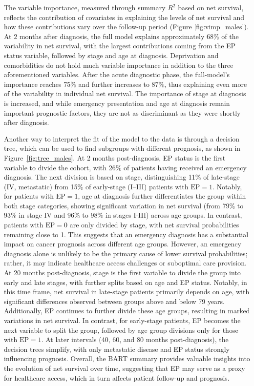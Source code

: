 \documentclass[12pt]{article}
\begin{document}
The variable importance, measured through summary $R^2$ based on net survival, reflects the contribution of covariates in explaining the levels of net survival and how these contributions vary over the follow-up period (Figure \ref{fig:vimp_males}). At 2 months after diagnosis, the full model explains approximately $68\%$ of the variability in net survival, with the largest contributions coming from the EP status variable, followed by stage and age at diagnosis. Deprivation and comorbidities do not hold much variable importance in addition to the three aforementioned variables. After the acute diagnostic phase, the full-model's importance reaches 75\% and further increases to 87\%, thus explaining even more of the variability in individual net survival. The importance of stage at diagnosis is increased, and while emergency presentation and age at diagnosis remain important prognostic factors, they are not as discriminant as they were shortly after diagnosis. 

Another way to interpret the fit of the model to the data is through a decision tree, which can be used to find subgroups with different prognosis, as shown in Figure~\ref{fig:tree_males}. At 2 months post-diagnosis, EP status is the first variable to divide the cohort, with 26\% of patients having received an emergency diagnosis. The next division is based on stage, distinguishing 11\% of late-stage (IV, metastatic) from 15\% of early-stage (I–III) patients with $\text{EP} = 1$. Notably, for patients with $\text{EP} = 1$, age at diagnosis further differentiates the group within both stage categories, showing significant variation in net survival (from 79\% to 93\% in stage IV and 96\% to 98\% in stages I-III) across age groups. In contrast, patients with $\text{EP} = 0$ are only divided by stage, with net survival probabilities remaining close to 1. This suggests that an emergency diagnosis has a substantial impact on cancer prognosis across different age groups. However, an emergency diagnosis alone is unlikely to be the primary cause of lower survival probabilities; rather, it may indicate healthcare access challenges or suboptimal care provision. At 20 months post-diagnosis, stage is the first variable to divide the group into early and late stages, with further splits based on age and EP status. Notably, in this time frame, net survival in late-stage patients primarily depends on age, with significant differences observed between groups above and below 79 years. Additionally, EP continues to further divide these age groups, resulting in marked variations in net survival. In contrast, for early-stage patients, EP becomes the next variable to split the group, followed by age group divisions only for those with $\text{EP} = 1$. At later intervals (40, 60, and 80 months post-diagnosis), the decision trees simplify, with only metastatic disease and EP status strongly influencing prognosis. Overall, the BART summary provides valuable insights into the evolution of net survival over time, suggesting that EP may serve as a proxy for healthcare access, which in turn affects patient follow-up and prognosis.
\end{document}
